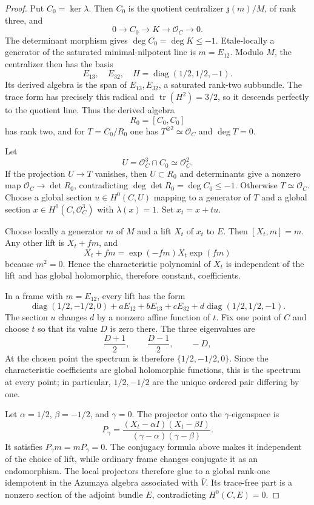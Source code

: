 \documentclass[11pt]{article}
\theoremstyle{definition}
\newcommand{\Ocal}{\mathcal O}
\begin{document}
\begin{proof}
Put $C_0=\ker\lambda$.  Then $C_0$ is the quotient centralizer
$\mathfrak z(m)/M$, of rank three, and
\[
 0\longrightarrow C_0\longrightarrow K\longrightarrow\Ocal_C\longrightarrow0.
\]
The determinant morphism gives $\deg C_0=\deg K\le-1$.  Etale-locally a
generator of the saturated minimal-nilpotent line is $m=E_{12}$.  Modulo
$M$, the centralizer then has the basis
\[
 E_{13},\quad E_{32},\quad
 H=\operatorname{diag}(1/2,1/2,-1).
\]
Its derived algebra is the span of $E_{13},E_{32}$, a saturated rank-two
subbundle.  The trace form has precisely this radical and
$\operatorname{tr}(H^2)=3/2$, so it descends perfectly to the quotient line.
Thus the derived algebra
\[
 R_0=[C_0,C_0]
\]
has rank two, and for $T=C_0/R_0$ one has
$T^{\otimes2}\simeq\Ocal_C$ and $\deg T=0$.

Let
\[
 U=\Ocal_C^3\cap C_0\simeq\Ocal_C^2.
\]
If the projection $U\to T$ vanishes, then $U\subset R_0$ and determinants
give a nonzero map $\Ocal_C\to\det R_0$, contradicting
$\deg\det R_0=\deg C_0\le-1$.  Otherwise $T\simeq\Ocal_C$.  Choose a global
section $u\in H^0(C,U)$ mapping to a generator of $T$ and a global section
$x\in H^0(C,\Ocal_C^3)$ with $\lambda(x)=1$.  Set $x_t=x+tu$.

Choose locally a generator $m$ of $M$ and a lift $X_t$ of $x_t$ to $E$.
Then $[X_t,m]=m$.  Any other lift is $X_t+fm$, and
\[
 X_t+fm=\exp(-fm)X_t\exp(fm)
\]
because $m^2=0$.  Hence the characteristic polynomial of $X_t$ is
independent of the lift and has global holomorphic, therefore constant,
coefficients.

In a frame with $m=E_{12}$, every lift has the form
\[
 \operatorname{diag}(1/2,-1/2,0)+aE_{12}+bE_{13}+cE_{32}
 +d\operatorname{diag}(1/2,1/2,-1).
\]
The section $u$ changes $d$ by a nonzero affine function of $t$.  Fix one
point of $C$ and choose $t$ so that its value $D$ is zero there.  The
three eigenvalues are
\[
 \frac{D+1}{2},\qquad \frac{D-1}{2},\qquad -D,
\]
At the chosen point the spectrum is therefore
$\{1/2,-1/2,0\}$.  Since the characteristic coefficients are global
holomorphic functions, this is the spectrum at every point; in particular,
$1/2,-1/2$ are the unique ordered pair differing by one.

Let $\alpha=1/2$, $\beta=-1/2$, and $\gamma=0$.  The projector onto the
$\gamma$-eigenspace is
\[
 P_\gamma=
 \frac{(X_t-\alpha I)(X_t-\beta I)}
      {(\gamma-\alpha)(\gamma-\beta)}.
\]
It satisfies $P_\gamma m=mP_\gamma=0$.  The conjugacy formula above makes it
independent of the choice of lift, while ordinary frame changes conjugate
it as an endomorphism.  The local projectors therefore glue to a global
rank-one idempotent in the Azumaya algebra associated with $\bar V$.  Its
trace-free part is a nonzero section of the adjoint bundle $E$, contradicting
$H^0(C,E)=0$.
\end{proof}
\end{document}
